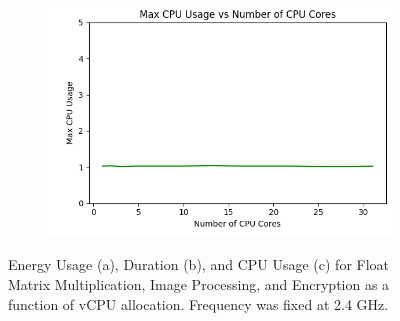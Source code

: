 \documentclass[times, 10pt,twocolumn]{article}
\begin{document}
\begin{figure}[ht]
\begin{subfigure}[b]{0.3\textwidth}
      \includegraphics[width=\textwidth]{imgs/study_1_results/var_cpu/encryption/CPU_CPUUsage.png}
     \caption{}
     \label{fig:plot9}
   \end{subfigure}
   
   \caption{Energy Usage (a), Duration (b), and CPU Usage (c) for Float Matrix Multiplication, Image Processing, and Encryption as a function of vCPU allocation. Frequency was fixed at 2.4 GHz.}
   \label{fig:cpu_stats}
 \end{figure}
 
\end{document}

